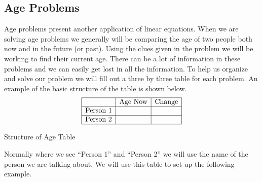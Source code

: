 \subsection{Age Problems}\pp

 {}\pp

 Age problems present another application of linear equations. When we
are solving age problems we generally will be comparing the age of two people
both now and in the future (or past). Using the clues given in the problem we
will be working to find their current age. There can be a lot of information
in these problems and we can easily get lost in all the information. To help
us organize and solve our problem we will fill out a three by three table for
each problem. An example of the basic structure of the table is shown below.
\[%
  \begin{array}{|c|c|c|}
    \hline
    & \mbox{Age~Now} & \mbox{Change}\\
    \hline
    \mbox{Person~1} &  & \\
    \hline
    \mbox{Person~2} &  & \\
    \hline
  \end{array} \]
\begin{center}
\small{Structure of Age Table}
\end{center}

 Normally where we see ``Person 1'' and ``Person 2'' we will use the name of
the person we are talking about. We will use this table to set up the
following example.


